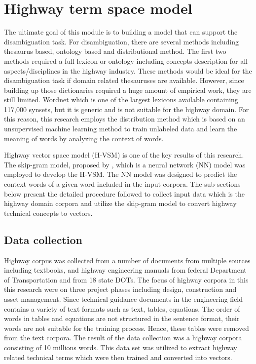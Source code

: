 \documentclass[NewProceedings, InsideFigs]{ascelike} %
\begin{document}
\section{Highway term space model} \label{sec:vector-space}
%
The ultimate goal of this module is to building a model that can support the disambiguation task. For disambiguation, there are several methods including thesaurus based, ontology based and distributional method. The first two methods required a full lexicon or ontology including concepts description for all aspects/disciplines in the highway industry. These methods would be ideal for the disambiguation task if domain related thesauruses are available. However, since building up those dictionaries required a huge amount of empirical work, they are still limited. Wordnet \cite{Miller95} which is one of the largest lexicons available containing 117,000 synsets, but it is generic and is not suitable for the highway domain. For this reason, this research employs the distribution method which is based on an unsupervised machine learning method to train unlabeled data and learn the meaning of words by analyzing the context of words.
\par
Highway vector space model (H-VSM) is one of the key results of this research. The skip-gram model, proposed by , which is a neural network (NN) model was employed to develop the H-VSM. The NN model was designed to predict the context words of a given word included in the input corpora. The sub-sections below present the detailed procedure followed to collect input data which is the highway domain corpora and utilize the skip-gram model to convert highway technical concepts to vectors.
%
\subsection{Data collection}
Highway corpus was collected from a number of documents from multiple sources including textbooks, and highway engineering manuals from federal Department of Transportation and from 18 state DOTs. The focus of highway corpora in this this research were on three  project phases including design, construction and asset management. Since technical guidance documents in the engineering field contains a variety of text formats such as text, tables, equations. The order of words in tables and equations are not structured in the sentence format, their words are not suitable for the training process. Hence, these tables were removed from the text corpora. The result of the data collection was a highway corpora consisting of 10 millions words. This data set was utilized to extract highway related technical terms which were then trained and converted into vectors. 
\end{document}
